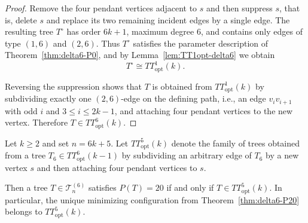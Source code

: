 \documentclass[preprint,12pt]{elsarticle}
\begin{document}
\begin{proof}
Remove the four pendant vertices adjacent to $s$ and then suppress $s$, that is,
delete $s$ and replace its two remaining incident edges by a single edge.
The resulting tree $T^\circ$ has order $6k+1$, maximum degree $6$, and contains
only edges of type $(1,6)$ and $(2,6)$.
Thus $T^\circ$ satisfies the parameter description of
Theorem~\ref{thm:delta6-P0}, and by Lemma~\ref{lem:TT1opt-delta6} we obtain
\[
T^\circ \cong TT^1_{\mathrm{opt}}(k).
\]

Reversing the suppression shows that $T$ is obtained from
$TT^1_{\mathrm{opt}}(k)$ by subdividing exactly one $(2,6)$-edge on the defining
path, i.e., an edge $v_iv_{i+1}$ with odd $i$ and $3\le i\le 2k-1$, and attaching
four pendant vertices to the new vertex.
Therefore $T\in TT^6_{\mathrm{opt}}(k)$.
\end{proof}





\begin{lemma}
\label{lem:TT5opt-delta6}
Let $k\ge 2$ and set $n=6k+5$.
Let $TT^5_{\mathrm{opt}}(k)$ denote the family of trees obtained from a tree
$T_6\in TT^6_{\mathrm{opt}}(k-1)$ by subdividing an arbitrary edge of $T_6$
by a new vertex $s$ and then attaching four pendant vertices to $s$.

Then a tree $T\in\mathcal{T}^{(6)}_n$ satisfies $P(T)=20$
if and only if $T\in TT^5_{\mathrm{opt}}(k)$.
In particular, the unique minimizing configuration from
Theorem~\ref{thm:delta6-P20} belongs to $TT^5_{\mathrm{opt}}(k)$.
\end{lemma}
\end{document}
